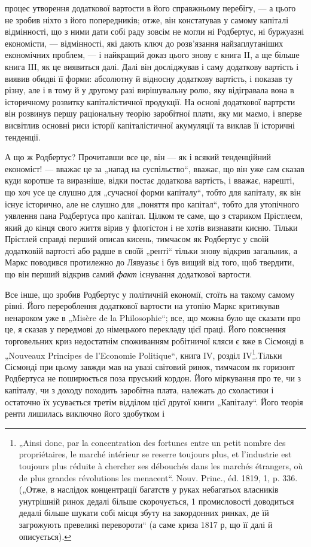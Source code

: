 \parcont{}  %
процес утворення додаткової вартости в його справжньому перебігу, — а
цього не зробив ніхто з його попередників; отже, він констатував у
самому капіталі відмінності, що з ними дати собі раду зовсім не могли
ні Родбертус, ні буржуазні економісти, — відмінності, які дають ключ до
розв’язання найзаплутаніших економічних проблем, — і найкращий доказ
цього знову є книга II, а ще більше книга IIІ, як це виявиться далі.
Далі він досліджував і саму додаткову вартість і виявив обидві її форми:
абсолютну й відносну додаткову вартість, і показав ту різну, але і в
тому й у другому разі вирішувальну ролю, яку відігравала вона в історичному
розвитку капіталістичної продукції. На основі додаткової вартрсти
він розвинув першу раціональну теорію заробітної плати, яку ми
маємо, і вперве висвітлив основні риси історії капіталістичної акумуляції
та виклав її історичні тенденції.

А що ж Родбертус? Прочитавши все це, він — як і всякий тенденційний
економіст! — вважає це за „напад на суспільство“, вважає, що він уже сам
сказав куди коротше та виразніше, відки постає додаткова вартість, і
вважає, нарешті, що хоч усе це слушно для „сучасної форми капіталу“,
тобто для капіталу, як він існує історично, але не слушно для „поняття
про капітал“, тобто для утопічного уявлення пана Родбертуса про капітал.
Цілком те саме, що з стариком Прістлеєм, який до кінця свого
життя вірив у флогістон і не хотів визнавати кисню. Тільки Прістлей
справді перший описав кисень, тимчасом як Родбертус у своїй додатковій
вартості або радше в своїй „ренті“ тільки знову відкрив загальник,
а Маркс поводився протилежно до Лявуазьє і був вищий від того, щоб
твердити, що він перший відкрив самий \emph{факт} існування додаткової
вартости.

Все інше, що зробив Родбертус у політичній економії, стоїть на
такому самому рівні. Його перероблення додаткової вартости на утопію
Маркс критикував ненароком уже в „Misère de la Philosophie“;
все, що можна було ще сказати про це, я сказав у передмові до німецького
перекладу цієї праці. Його пояснення торговельних криз недостатнім
споживанням робітничої кляси є вже в Сісмонді в „Nouveaux Principes
de l’Economie Politique“, книга IV, розділ IV\footnote{
„Ainsi donc, par la concentration des fortunes entre un petit nombre des propriétaires,
le marché intérieur se reserre toujours plus, et l'industrie est toujours plus
réduite à chercher ses débouchés dans les marchés étrangers, où de plus grandes révolutions
les menacent“. Nouv. Princ., éd. 1819, 1, p. 336. („Отже, в наслідок концентрації
багатств у руках небагатьох власників унутрішній ринок дедалі більше
скорочується, 1 промисловості доводиться дедалі більше шукати собі місця збуту
на закордонних ринках, де їй загрожують превеликі перевороти“ (а саме криза
1817 р, що її далі й описується).
}.Тільки Сісмонді
при цьому завжди мав на увазі світовий ринок, тимчасом як горизонт
Родбертуса не поширюється поза пруський кордон. Його міркування про
те, чи з капіталу, чи з доходу походить заробітна плата, належать до
схоластики і остаточно їх усувається третім відділом цієї другої книги
„Капіталу“. Його теорія ренти лишилась виключно його здобутком і
\parbreak{}  %
